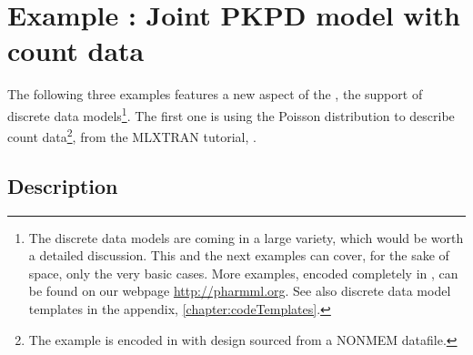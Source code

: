 
\section{Example \theexamples: Joint PKPD model with count data}
\label{sec:eg6}
The following three examples features a new aspect of the \pml, the support of discrete 
data models\footnote{The discrete data models are coming in a large variety, which 
would be worth a detailed discussion. This and the next examples can cover, for 
the sake of space, only the very basic cases. More examples, encoded completely 
in \pml, can be found on our webpage \url{http://pharmml.org}. See also discrete data 
model templates in the appendix, \ref{chapter:codeTemplates}.}. The first one is using 
the Poisson distribution to describe count data\footnote{The example is encoded 
in  with design sourced from a NONMEM datafile.}, 
from the MLXTRAN tutorial, \cite{Monolix4.3Tutorial:2014}.
\subsection{Description}
\label{subsec:exp6_intro}
 
